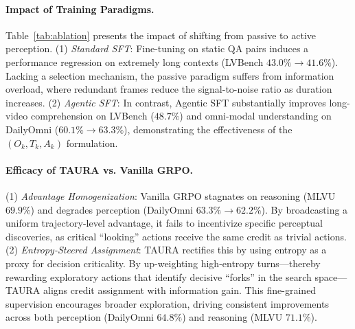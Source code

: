 \documentclass{article}
\theoremstyle{plain}
\theoremstyle{definition}
\theoremstyle{remark}
\begin{document}
\paragraph{Impact of Training Paradigms.}
Table~\ref{tab:ablation} presents the impact of shifting from passive to active perception.
(1) \textit{Standard SFT}: Fine-tuning on static QA pairs induces a performance regression on extremely long contexts (LVBench $43.0\% \to 41.6\%$). Lacking a selection mechanism, the passive paradigm suffers from information overload, where redundant frames reduce the signal-to-noise ratio as duration increases.
(2) \textit{Agentic SFT}: In contrast, Agentic SFT substantially improves long-video comprehension on LVBench ($48.7\%$) and omni-modal understanding on DailyOmni ($60.1\% \to 63.3\%$), demonstrating the effectiveness of the $(O_k, T_k, A_k)$ formulation.

\paragraph{Efficacy of TAURA vs. Vanilla GRPO.}
(1) \textit{Advantage Homogenization}: Vanilla GRPO stagnates on reasoning (MLVU $69.9\%$) and degrades perception (DailyOmni $63.3\% \to 62.2\%$).
By broadcasting a uniform trajectory-level advantage, it fails to
incentivize specific perceptual discoveries, as critical ``looking''
actions receive the same credit as trivial actions.
(2) \textit{Entropy-Steered Assignment}: TAURA rectifies this by using entropy as a proxy for decision criticality. By up-weighting high-entropy turns---thereby rewarding exploratory actions that identify decisive ``forks'' in the search space---TAURA aligns credit assignment with information gain. This fine-grained supervision encourages broader exploration, driving consistent improvements across both perception (DailyOmni $64.8\%$) and reasoning (MLVU $71.1\%$).
\end{document}
